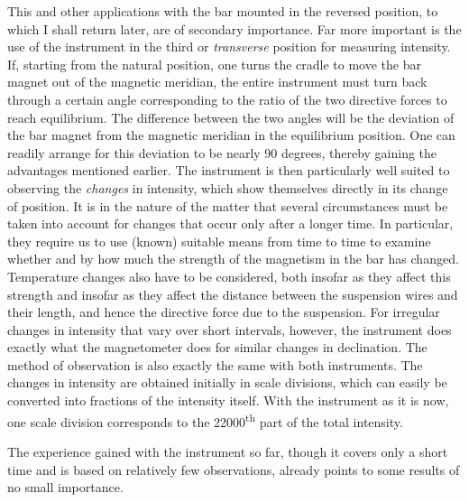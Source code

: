 This and other applications with the bar mounted in the reversed position, to which I shall return later, are of secondary importance. Far more important is the use of the instrument in the third or \textit{transverse} position for measuring intensity. If, starting from the natural position, one turns the cradle to move the bar magnet out of the magnetic meridian, the entire instrument must turn back through a certain angle corresponding to the ratio of the two directive forces to reach equilibrium. The difference between the two angles will be the deviation of the bar magnet from the magnetic meridian in the equilibrium position. One can readily arrange for this deviation to be nearly 90 degrees, thereby gaining the advantages mentioned earlier. The instrument is then particularly well suited to observing the \textit{changes} in intensity, which show themselves directly in its change of position. It is in the nature of the matter that several circumstances must be taken into account for changes that occur only after a longer time. In particular, they require us to use (known) suitable means from time to time to examine whether and by how much the strength of the magnetism in the bar has changed. Temperature changes also have to be considered, both insofar as they affect this strength and insofar as they affect the distance between the suspension wires and their length, and hence the directive force due to the suspension. For irregular changes in intensity that vary over short intervals, however, the instrument does exactly what the magnetometer does for similar changes in declination. The method of observation is also exactly the same with both instruments. The changes in intensity are obtained initially in scale divisions, which can easily be converted into fractions of the intensity itself. With the instrument as it is now, one scale division corresponds to the 22000\textsuperscript{th} part of the total intensity.

The experience gained with the instrument so far, though it covers only a short time and is based on relatively few observations, already points to some results of no small importance.

